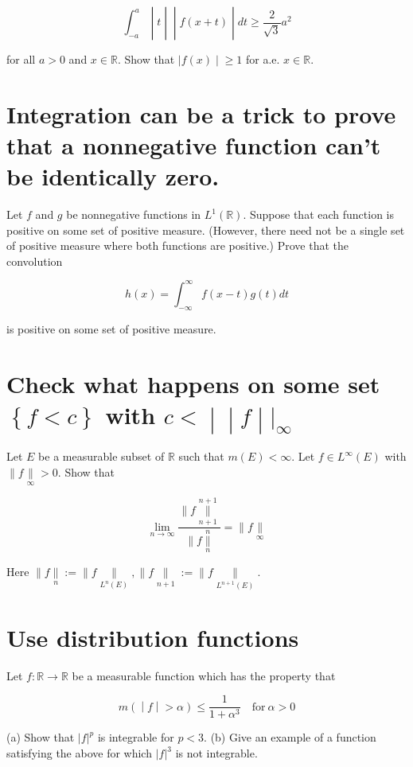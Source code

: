 \documentclass{qlnotes-export}
\begin{document}
\[\left. \int_{- a}^{a} \middle| t \middle| \middle| f(x + t) \middle| dt \geq \frac{2}{\sqrt{3}}a^{2} \right.\]

for all \(a > 0\) and \(x \in {\mathbb{R}}\). Show that \(\left. |f(x) \middle| \geq 1 \right.\) for a.e. \(x \in {\mathbb{R}}\).

\chapter{Integration can be a trick to prove that a nonnegative function can't be identically zero.}

Let \(f\) and \(g\) be nonnegative functions in \(L^{1}({\mathbb{R}})\). Suppose that each function is positive on some set of positive measure. (However, there need not be a single set of positive measure where both functions are positive.) Prove that the convolution

\[h(x) = \int_{- \infty}^{\infty}f(x - t)g(t)dt\]

is positive on some set of positive measure.

\chapter{\texorpdfstring{Check what happens on some set \(\left\{ {f < c} \right\}\) with \(\left. c < \middle| \middle| f \middle| |_{\infty} \right.\)}{Check what happens on some set \textbackslash left\textbackslash\{ \{f \textless{} c\} \textbackslash right\textbackslash\} with \textbackslash left. c \textless{} \textbackslash middle\textbar{} \textbackslash middle\textbar{} f \textbackslash middle\textbar{} \textbar\_\{\textbackslash infty\} \textbackslash right.}}\label{check-what-happens-on-some-set-fc-with-cf_infty}

Let \(E\) be a measurable subset of \(\mathbb{R}\) such that \(m(E) < \infty\). Let \(f \in L^{\infty}(E)\) with \(\parallel f\underset{\infty}{\parallel} > 0\). Show that

\[\lim\limits_{n\rightarrow\infty}\frac{\parallel f\underset{n + 1}{\overset{n + 1}{\parallel}}}{\parallel f\underset{n}{\overset{n}{\parallel}}} = \parallel f\underset{\infty}{\parallel}\]

Here \(\parallel f\underset{n}{\parallel} := \parallel f\underset{L^{n}(E)}{\parallel}, \parallel f\underset{n + 1}{\parallel} := \parallel f\underset{L^{n + 1}(E)}{\parallel}\).

\chapter{Use distribution functions}\label{use-distribution-functions}

Let \(f:{\mathbb{R}}\rightarrow{\mathbb{R}}\) be a measurable function which has the property that

\[\left. m( \middle| f \middle| > \alpha) \leq \frac{1}{1 + \alpha^{3}}\quad\text{for}\ \alpha > 0 \right.\]

(a) Show that \(|f|^{p}\) is integrable for \(p < 3\). (b) Give an example of a function satisfying the above for which \(|f|^{3}\) is not integrable.

\printbibliography
\end{document}
